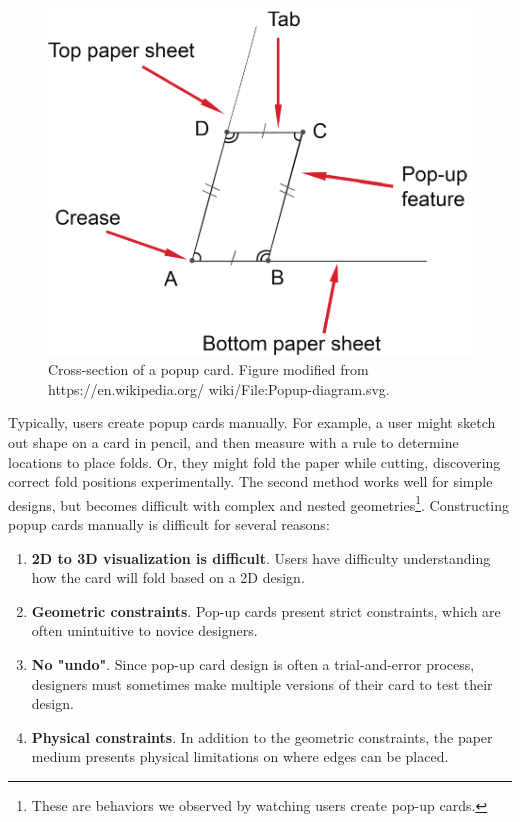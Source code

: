 \begin{figure}[htbp]
\centering
\includegraphics{figures/shared/01_Background/popup-diagram.pdf}
\caption{Cross-section of a popup card. Figure modified from
https://en.wikipedia.org/ wiki/File:Popup-diagram.svg.}
\end{figure}

Typically, users create popup cards manually. For example, a user might
sketch out shape on a card in pencil, and then measure with a rule to
determine locations to place folds. Or, they might fold the paper while
cutting, discovering correct fold positions experimentally. The second
method works well for simple designs, but becomes difficult with complex
and nested geometries\footnote{These are behaviors we observed by
  watching users create pop-up cards.}. Constructing popup cards
manually is difficult for several reasons:

\begin{enumerate}
\def\labelenumi{\arabic{enumi}.}
\itemsep1pt\parskip0pt
\item
  \textbf{2D to 3D visualization is difficult}. Users have difficulty
  understanding how the card will fold based on a 2D design.
\item
  \textbf{Geometric constraints}. Pop-up cards present strict
  constraints, which are often unintuitive to novice designers.\\
\item
  \textbf{No "undo"}. Since pop-up card design is often a
  trial-and-error process, designers must sometimes make multiple
  versions of their card to test their design.
\item
  \textbf{Physical constraints}. In addition to the geometric
  constraints, the paper medium presents physical limitations on where
  edges can be placed.
\end{enumerate}

